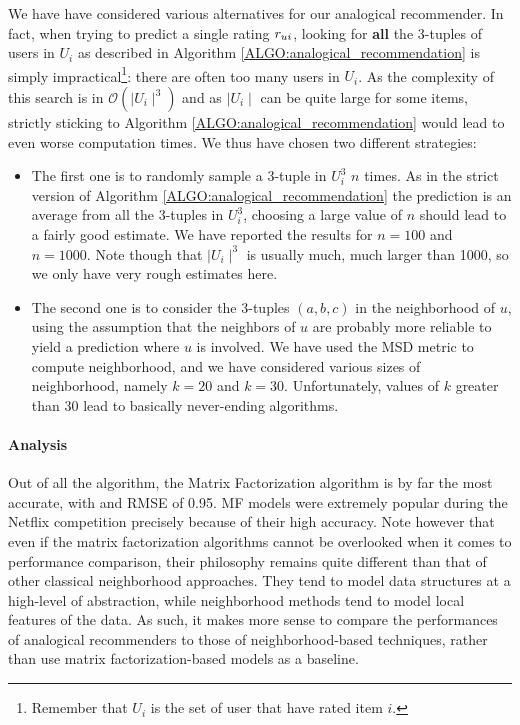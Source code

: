 We have have considered various alternatives for our analogical
recommender. In fact, when trying to predict a single rating $r_{ui}$, looking
for \textbf{all} the $3$-tuples of users in $U_i$ as described in Algorithm
\ref{ALGO:analogical_recommendation} is simply impractical\footnote{Remember
that $U_i$ is the set of user that have rated item $i$.}: there are often too
many users in $U_i$. As the complexity of this search is in $\mathcal{O}(\mid
U_i\mid^3)$ and as $\mid U_i\mid$ can be quite large for some items, strictly
sticking to Algorithm \ref{ALGO:analogical_recommendation} would lead to
even worse computation times. We thus have chosen two different strategies:
\begin{itemize}
  \item The first one is to randomly sample a $3$-tuple in $U_i^3$ $n$ times.
    As in the strict version of Algorithm \ref{ALGO:analogical_recommendation}
    the prediction is an average from all the $3$-tuples in $U_i^3$, choosing a
    large value of $n$ should lead to a fairly good estimate. We have reported
    the results for $n = 100$ and $n = 1000$. Note though that $\mid U_i
    \mid^3$ is usually much, much larger than 1000, so we only have very rough
    estimates here.
  \item The second one is to consider the $3$-tuples $(a, b, c)$ in the
    neighborhood of $u$, using the assumption that the neighbors of $u$ are
    probably more reliable to yield a prediction where $u$ is involved. We have
    used the MSD metric to compute neighborhood, and we have considered various
    sizes of neighborhood, namely $k = 20$  and $k = 30$. Unfortunately, values
    of $k$ greater than $30$ lead to basically never-ending algorithms.
\end{itemize}


\paragraph{Analysis\\}

Out of all the algorithm, the Matrix Factorization algorithm is by far the most
accurate, with and RMSE of 0.95. MF models were extremely popular during the
Netflix competition precisely because of their high accuracy. Note however that
even if the matrix factorization algorithms cannot be overlooked when it comes
to performance comparison, their philosophy remains quite different than that
of other classical neighborhood approaches. They tend to model data structures
at a high-level of abstraction, while neighborhood methods tend to model local
features of the data. As such, it makes more sense to compare the performances
of analogical recommenders to those of neighborhood-based techniques, rather
than use matrix factorization-based models as a baseline.

